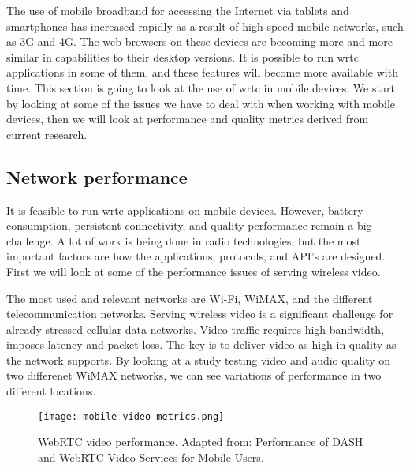 
The use of mobile broadband for accessing the Internet via tablets and smartphones has increased rapidly as a result of high speed mobile networks, such as 3G and 4G. The web browsers on these devices are becoming more and more similar in capabilities to their desktop versions. It is possible to run \gls{wrtc} applications in some of them, and these features will become more available with time. This section is going to look at the use of \gls{wrtc} in mobile devices. We start by looking at some of the issues we have to deal with when working with mobile devices, then we will look at performance and quality metrics derived from current research.

\subsection{Network performance}
It is feasible to run \gls{wrtc} applications on mobile devices. However, battery consumption, persistent connectivity, and quality performance remain a big challenge. A lot of work is being done in radio technologies, but the most important factors are how the applications, protocols, and API's are designed\cite{isomaki2012considerations}. First we will look at some of the performance issues of serving wireless video.

The most used and relevant networks are Wi-Fi, WiMAX, and the different telecommunication networks. Serving wireless video is a significant challenge for already-stressed cellular data networks\cite{erman2011over}. Video traffic requires high bandwidth, imposes latency and packet loss. The key is to deliver video as high in quality as the network supports. By looking at a study testing video and audio quality on two differenet WiMAX networks\cite{fund2013performance}, we can see variations of performance in two different locations.

\pagebreak
\begin{figure}[here]
\centerline{\texttt{[image: mobile-video-metrics.png]}}
\caption{WebRTC video performance. Adapted from: Performance of DASH and WebRTC Video Services for Mobile Users\cite{fund2013performance}.}
\label{fig:mobile-video-metrics}
\end{figure}

